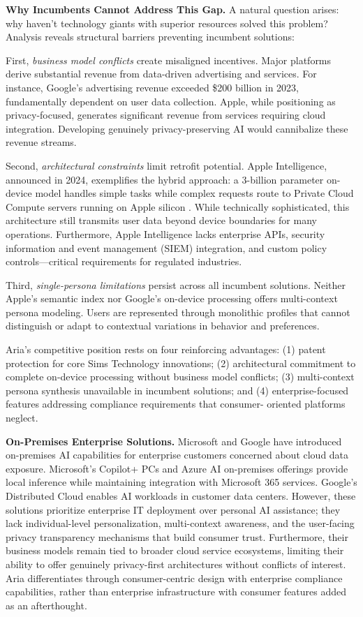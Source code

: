 \documentclass[11pt]{article}
\begin{document}
\textbf{Why Incumbents Cannot Address This Gap.} 
A natural question arises: why haven't technology giants with superior resources solved this problem? Analysis reveals structural barriers preventing incumbent solutions:

First, \textit{business model conflicts} create misaligned incentives. Major 
platforms derive substantial revenue from data-driven advertising and services. 
For instance, Google's advertising revenue exceeded \$200 billion in 2023, 
fundamentally dependent on user data collection. Apple, while positioning as 
privacy-focused, generates significant revenue from services requiring cloud 
integration. Developing genuinely privacy-preserving AI would cannibalize 
these revenue streams.

Second, \textit{architectural constraints} limit retrofit potential. Apple 
Intelligence, announced in 2024, exemplifies the hybrid approach: a 3-billion 
parameter on-device model handles simple tasks while complex requests route 
to Private Cloud Compute servers running on Apple silicon 
\cite{apple2024foundation}. While technically sophisticated, this architecture 
still transmits user data beyond device boundaries for many operations. 
Furthermore, Apple Intelligence lacks enterprise APIs, security information 
and event management (SIEM) integration, and custom policy controls---critical 
requirements for regulated industries.

Third, \textit{single-persona limitations} persist across all incumbent 
solutions. Neither Apple's semantic index nor Google's on-device processing 
offers multi-context persona modeling. Users are represented through monolithic 
profiles that cannot distinguish or adapt to contextual variations in behavior 
and preferences.

Aria's competitive position rests on four reinforcing advantages: (1) patent 
protection for core Sims Technology innovations; (2) architectural commitment 
to complete on-device processing without business model conflicts; (3) 
multi-context persona synthesis unavailable in incumbent solutions; and (4) 
enterprise-focused features addressing compliance requirements that consumer-
oriented platforms neglect.

\textbf{On-Premises Enterprise Solutions.} Microsoft and Google have 
introduced on-premises AI capabilities for enterprise customers concerned 
about cloud data exposure. Microsoft's Copilot+ PCs and Azure AI on-premises 
offerings provide local inference while maintaining integration with Microsoft 
365 services. Google's Distributed Cloud enables AI workloads in customer 
data centers. However, these solutions prioritize enterprise IT deployment 
over personal AI assistance; they lack individual-level personalization, 
multi-context awareness, and the user-facing privacy transparency mechanisms 
that build consumer trust. Furthermore, their business models remain tied 
to broader cloud service ecosystems, limiting their ability to offer 
genuinely privacy-first architectures without conflicts of interest. Aria 
differentiates through consumer-centric design with enterprise compliance 
capabilities, rather than enterprise infrastructure with consumer features 
added as an afterthought.
\end{document}
